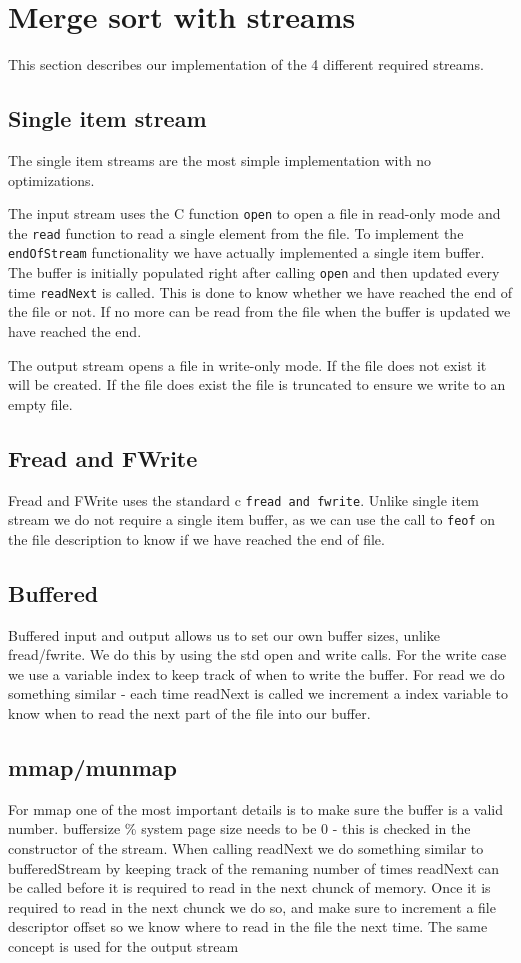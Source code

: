 \section{Merge sort with streams}
This section describes our implementation of the 4 different required streams. 

\subsection{Single item stream}
The single item streams are the most simple implementation with no optimizations.

The input stream uses the C function \texttt{open} to open a file in read-only mode and the \texttt{read} function to read a single element from the file. To implement the \texttt{endOfStream} functionality we have actually implemented a single item buffer. The buffer is initially populated right after calling \texttt{open} and then updated every time \texttt{readNext} is called. This is done to know whether we have reached the end of the file or not. If no more can be read from the file when the buffer is updated we have reached the end.

The output stream opens a file in write-only mode. If the file does not exist it will be created. If the file does exist the file is truncated to ensure we write to an empty file.

\subsection{Fread and FWrite}
Fread and FWrite uses the standard c \texttt{fread and fwrite}. Unlike single item stream we do not require a single item buffer, as we can use the call to \texttt{feof} on the file description to know if we have reached the end of file. 


\subsection{Buffered}
Buffered input and output allows us to set our own buffer sizes, unlike fread/fwrite. We do this by using the std open and write calls. For the write case we use a variable index to keep track of when to write the buffer. For read we do something similar - each time readNext is called we increment a index variable to know when to read the next part of the file into our buffer.  	


\subsection{mmap/munmap}
For mmap one of the most important details is to make sure the buffer is a valid number. buffersize \% system page size needs to be 0 - this is checked in the constructor of the stream. When calling readNext we do something similar to bufferedStream by keeping track of the remaning number of times readNext can be called before it is required to read in the next chunck of memory.     
Once it is required to read in the next chunck we do so, and make sure to increment a file descriptor offset so we know where to read in the file the next time. The same concept is used for the output stream
